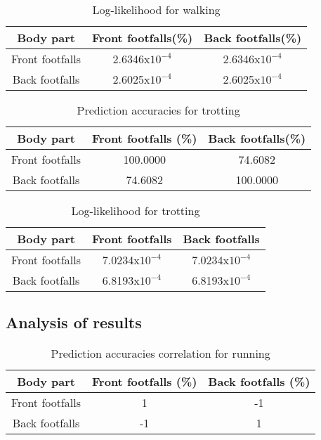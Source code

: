 \begin{table}[h!] 
	\centering
	\begin{tabular}{ |c|c|c|} 	
		\hline	
		\textbf{Body part} & \textbf{Front footfalls(\%)} &  \textbf{Back footfalls(\%)}\\ 
		\hline
		Front footfalls & 2.6346x\(10^{-4}\) & 2.6346x\(10^{-4}\)\\ 
		\hline
		Back footfalls & 2.6025x\(10^{-4}\) & 2.6025x\(10^{-4}\)\\ 
		\hline	   	
	\end{tabular}
	\caption{Log-likelihood for walking}
	\label{tab:front-back-walk-log}
\end{table}


\begin{table}[h!] 
	\centering
	\begin{tabular}{ |c|c|c|} 	
		\hline	
		\textbf{Body part} & \textbf{Front footfalls (\%)} &  \textbf{Back footfalls(\%)}\\ 
		\hline
		Front footfalls &  100.0000 & 74.6082\\ 
		\hline
		Back footfalls & 74.6082 & 100.0000 \\ 
		\hline	   	
	\end{tabular}
	\caption{Prediction accuracies for trotting}
	\label{tab:front-back-trot-acc}
\end{table}


\begin{table}[h!] 
	\centering
	\begin{tabular}{ |c|c|c|} 	
		\hline	
		\textbf{Body part} & \textbf{Front footfalls} &  \textbf{Back footfalls}\\ 
		\hline
		Front footfalls & 7.0234x\(10^{-4}\) & 7.0234x\(10^{-4}\)\\ 
		\hline
		Back footfalls & 6.8193x\(10^{-4}\) & 6.8193x\(10^{-4}\)\\ 
		\hline	   	
	\end{tabular}
	\caption{Log-likelihood for trotting}
	\label{tab:front-back-trot-log}
\end{table}

\subsection{Analysis of results}

\begin{table}[h!] 
	\centering
	\begin{tabular}{ |c|c|c|} 	
		\hline	
		\textbf{Body part} & \textbf{Front footfalls (\%)} &  \textbf{Back footfalls (\%)}\\ 
		\hline
		Front footfalls & 1 & -1\\ 
		\hline
		Back footfalls & -1 & 1 \\ 
		\hline	   	
	\end{tabular}
	\caption{Prediction accuracies correlation for running}
	\label{tab:front-back-run-acc-corr}
\end{table}

